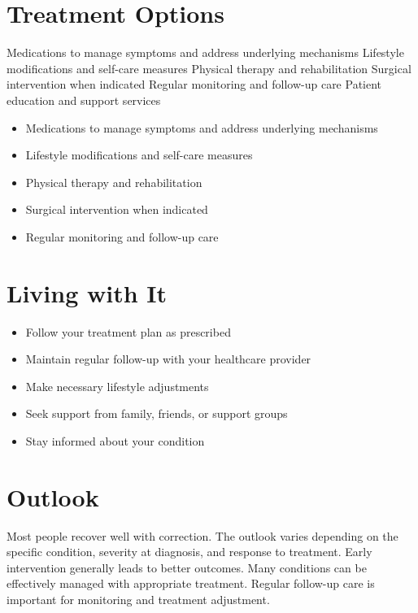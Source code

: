 \section{Treatment Options}
Medications to manage symptoms and address underlying mechanisms Lifestyle modifications and self-care measures Physical therapy and rehabilitation Surgical intervention when indicated Regular monitoring and follow-up care Patient education and support services

\begin{itemize}[noitemsep]
  \item Medications to manage symptoms and address underlying mechanisms
  \item Lifestyle modifications and self-care measures
  \item Physical therapy and rehabilitation
  \item Surgical intervention when indicated
  \item Regular monitoring and follow-up care
\end{itemize}
\section{Living with It}
\begin{itemize}[noitemsep]
  \item Follow your treatment plan as prescribed
  \item Maintain regular follow-up with your healthcare provider
  \item Make necessary lifestyle adjustments
  \item Seek support from family, friends, or support groups
  \item Stay informed about your condition
\end{itemize}
\section{Outlook}
Most people recover well with correction. The outlook varies depending on the specific condition, severity at diagnosis, and response to treatment. Early intervention generally leads to better outcomes. Many conditions can be effectively managed with appropriate treatment. Regular follow-up care is important for monitoring and treatment adjustment.
